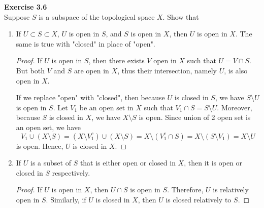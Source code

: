\documentclass[12pt, a4paper]{article}
\theoremstyle{plain}
\newenvironment{exercise}[2][Exercise]
    { \begin{mdframed}[backgroundcolor=gray!20] \textbf{#1 #2} \\}
    {  \end{mdframed}}
\begin{document}
\begin{exercise}{3.6}
Suppose $S$ is a subspace of the topological space $X$. Show that
\begin{enumerate}[label=(\alph*)]
\item If $U\subset S\subset X$, $U$ is open in $S$, and $S$ is open in $X$, then $U$ is open in $X$. The same is true with "closed" in place of "open".
	\begin{proof}
	If $U$ is open in $S$, then there exists $V$ open in $X$ such that $U=V\cap S$. But both $V$ and $S$ are open in $X$, thus their intersection, namely $U$, is also open in $X$. 
	
	If we replace "open" with "closed", then because $U$ is closed in $S$, we have $S\setminus U$ is open in $S$. Let $V_1$ be an open set in $X$ such that $V_1\cap S=S\setminus U$. Moreover, because $S$ is closed in $X$, we have $X\setminus S$ is open. Since union of 2 open set is an open set, we have
	\[
	V_1\cup(X\setminus S)=(X\setminus V_1^c)\cup(X\setminus S)=X\setminus(V_1^c\cap S)=X\setminus(S\setminus V_1)=X\setminus U
	\]
	is open. Hence, $U$ is closed in $X$.
	\end{proof}
	
\item If $U$ is a subset of $S$ that is either open or closed in $X$, then it is open or closed in $S$ respectively.
	\begin{proof}
	If $U$ is open in $X$, then $U\cap S$ is open in $S$. Therefore, $U$ is relatively open in $S$. Similarly, if $U$ is closed in $X$, then $U$ is closed relatively to $S$.
	\end{proof}
\end{enumerate}
\end{exercise}
\end{document}
